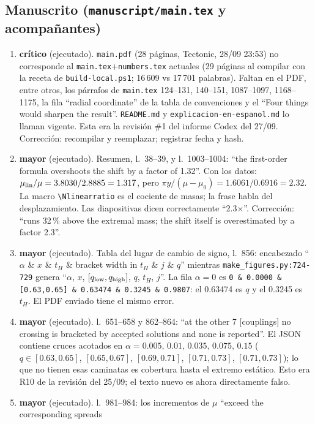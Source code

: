 \documentclass[10pt,a4paper]{article}
\newcommand{\CRIT}{\textcolor{crit}{\textbf{crítico}}}
\newcommand{\MAY}{\textcolor{may}{\textbf{mayor}}}
\newcommand{\code}[1]{\texttt{#1}}
\begin{document}
\subsection{Manuscrito (\code{manuscript/main.tex} y acompañantes)}
\label{sec:ms}

\begin{enumerate}[label=M\arabic*.,leftmargin=2.4em]
\item \CRIT{} (ejecutado). \code{main.pdf} (28 páginas, Tectonic, 28/09 23:53) no corresponde al
 \code{main.tex}+\code{numbers.tex} actuales (29 páginas al compilar con la receta de
 \code{build-local.ps1}; 16\,609 vs 17\,701 palabras). Faltan en el PDF, entre otros, los párrafos
 de \code{main.tex} 124--131, 140--151, 1087--1097, 1168--1175, la fila ``radial coordinate'' de la
 tabla de convenciones y el ``Four things would sharpen the result''. \code{README.md} y
 \code{explicacion-en-espanol.md} lo llaman vigente. Esta era la revisión \#1 del informe Codex del
 27/09. Corrección: recompilar y reemplazar; registrar fecha y hash.
\item \MAY{} (ejecutado). Resumen, l.~38--39, y l.~1003--1004: ``the first-order formula overshoots
 the shift by a factor of 1.32''. Con los datos: $\mu_{\rm lin}/\mu=3.8030/2.8885=1.317$, pero
 $\pi y/(\mu-\mu_0)=1.6061/0.6916=2.32$. La macro \code{\textbackslash Nlinearratio} es el cociente
 de masas; la frase habla del desplazamiento. Las diapositivas dicen correctamente ``2.3$\times$''.
 Corrección: ``runs 32\,\% above the extremal mass; the shift itself is overestimated by a factor 2.3''.
\item \MAY{} (ejecutado). Tabla del lugar de cambio de signo, l.~856: encabezado
 ``$\alpha$ \& $x$ \& $t_H$ \& bracket width in $t_H$ \& $j$ \& $q$'' mientras
 \code{make\_figures.py:724-729} genera ``$\alpha$, $x$, $[q_{\rm low},q_{\rm high}]$, $q$, $t_H$, $j$''.
 La fila $\alpha=0$ es \code{0 \& 0.0000 \& [0.63,0.65] \& 0.63474 \& 0.3245 \& 0.9807}: el
 0.63474 es $q$ y el 0.3245 es $t_H$. El PDF enviado tiene el mismo error.
\item \MAY{} (ejecutado). l.~651--658 y 862--864: ``at the other 7 [couplings] no crossing is
 bracketed by accepted solutions and none is reported''. El JSON contiene cruces acotados en
 $\alpha=0.005,\,0.01,\,0.035,\,0.075,\,0.15$ ($q\in[0.63,0.65]$, $[0.65,0.67]$, $[0.69,0.71]$,
 $[0.71,0.73]$, $[0.71,0.73]$); lo que no tienen esas caminatas es cobertura hasta el extremo
 estático. Esto era R10 de la revisión del 25/09; el texto nuevo es ahora directamente falso.
\item \MAY{} (ejecutado). l.~981--984: los incrementos de $\mu$ ``exceed the corresponding spreads

\end{enumerate}
\end{document}
